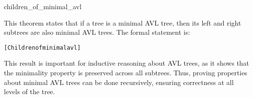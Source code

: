     \begin{thm}{children\_of\_minimal\_avl}

    This theorem states that if a tree is a minimal AVL tree, then its left and right subtrees are also minimal AVL trees. The formal statement is:

    \begin{alltt}
    	[Children of minimal avl]
    \end{alltt}
    
    \end{thm}
    This result is important for inductive reasoning about AVL trees, as it shows that the minimality property is preserved across all subtrees. Thus, proving properties about minimal AVL trees can be done recursively, ensuring correctness at all levels of the tree.

